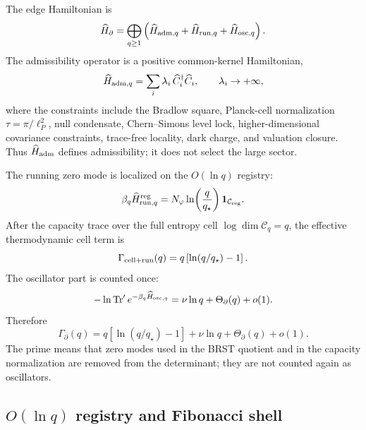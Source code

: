 \documentclass[aps,prd,reprint,nofootinbib,superscriptaddress,floatfix]{revtex4-2}
\numberwithin{equation}{section}
\theoremstyle{definition}
\theoremstyle{plain}
\begin{document}
The edge Hamiltonian is
\[
\widehat H_\partial
=
\bigoplus_{q\ge1}
\left(
\widehat H_{{\rm adm},q}
+
\widehat H_{{\rm run},q}
+
\widehat H_{{\rm osc},q}
\right).
\]
The admissibility operator is a positive common-kernel Hamiltonian,
\[
\widehat H_{{\rm adm},q}
=
\sum_i \lambda_i\,\widehat C_i^\dagger\widehat C_i,\qquad
\lambda_i\rightarrow+\infty ,
\]
where the constraints include the Bradlow square, Planck-cell normalization
\(\tau=\pi/\ell_P^2\), null condensate, Chern--Simons level lock,
higher-dimensional covariance constraints, trace-free locality, dark charge,
and valuation closure.  Thus \(\widehat H_{\rm adm}\) defines admissibility;
it does not select the large sector.

The running zero mode is localized on the \(O(\ln q)\) registry:
\[
\beta_q\widehat H_{{\rm run},q}^{\rm reg}
=
N_\varphi
\ln\!\left(\frac{q}{q_\star}\right)
\mathbf 1_{\mathcal C_{\rm reg}} .
\]
After the capacity trace over the full entropy cell
\(\log\dim\mathcal C_q=q\), the effective thermodynamic cell term is
\[
\Gamma_{\rm cell+run}(q)
=
q\left[\ln(q/q_\star)-1\right].
\]
The oscillator part is counted once:
\[
-\ln\operatorname{Tr}'e^{-\beta_q\widehat H_{{\rm osc},q}}
=
\nu\ln q+\Theta_\partial(q)+o(1).
\]
Therefore
\[
\boxed{
\Gamma_\partial(q)
=
q\left[\ln(q/q_\star)-1\right]
+\nu\ln q+\Theta_\partial(q)+o(1).
}
\]
The prime means that zero modes used in the BRST quotient and in the capacity
normalization are removed from the determinant; they are not counted again as
oscillators.

\subsection{\texorpdfstring{\(O(\ln q)\)}{O(log q)} registry and Fibonacci shell}
\end{document}
